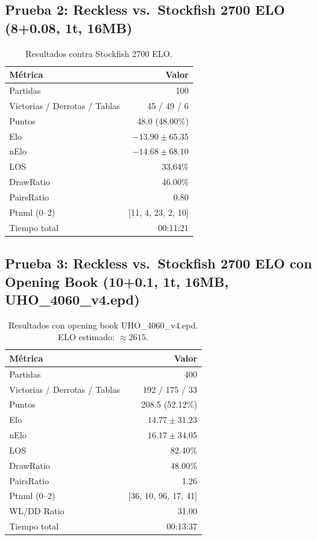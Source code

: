 \documentclass[12pt]{article}
\begin{document}
\subsection*{Prueba 2: Reckless vs.\ Stockfish 2700 ELO (8+0.08, 1t, 16MB)}

\begin{table}[h]
\centering
\begin{tabular}{@{}lr@{}}
\toprule
\textbf{Métrica} & \textbf{Valor} \\
\midrule
Partidas & 100 \\
Victorias / Derrotas / Tablas & 45 / 49 / 6 \\
Puntos & 48.0 (48.00\%) \\
Elo & $-13.90 \pm 65.35$ \\
nElo & $-14.68 \pm 68.10$ \\
LOS & 33.64\% \\
DrawRatio & 46.00\% \\
PairsRatio & 0.80 \\
Ptnml (0--2) & [11, 4, 23, 2, 10] \\
Tiempo total & 00:11:21 \\
\bottomrule
\end{tabular}
\caption{Resultados contra Stockfish 2700 ELO.}
\end{table}

\subsection*{Prueba 3: Reckless vs.\ Stockfish 2700 ELO con Opening Book (10+0.1, 1t, 16MB, UHO\_4060\_v4.epd)}

\begin{table}[h]
\centering
\begin{tabular}{@{}lr@{}}
\toprule
\textbf{Métrica} & \textbf{Valor} \\
\midrule
Partidas & 400 \\
Victorias / Derrotas / Tablas & 192 / 175 / 33 \\
Puntos & 208.5 (52.12\%) \\
Elo & $14.77 \pm 31.23$ \\
nElo & $16.17 \pm 34.05$ \\
LOS & 82.40\% \\
DrawRatio & 48.00\% \\
PairsRatio & 1.26 \\
Ptnml (0--2) & [36, 10, 96, 17, 41] \\
WL/DD Ratio & 31.00 \\
Tiempo total & 00:13:37 \\
\bottomrule
\end{tabular}
\caption{Resultados con opening book UHO\_4060\_v4.epd. ELO estimado: $\approx 2615$.}
\end{table}
\end{document}
